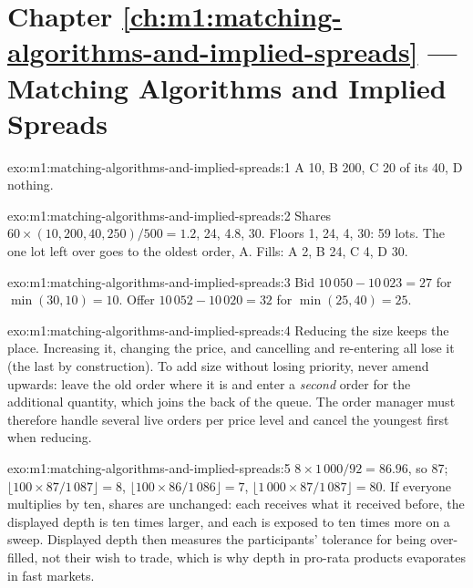 \section*{Chapter \ref{ch:m1:matching-algorithms-and-implied-spreads} --- Matching Algorithms and Implied Spreads}

\begin{solution}{exo:m1:matching-algorithms-and-implied-spreads:1}
A 10, B 200, C 20 of its 40, D nothing.
\end{solution}

\begin{solution}{exo:m1:matching-algorithms-and-implied-spreads:2}
Shares $60 \times (10, 200, 40, 250)/500 = 1.2$, 24, 4.8, 30. Floors 1, 24, 4,
30: 59 lots. The one lot left over goes to the oldest order, A. Fills: A 2, B
24, C 4, D 30.
\end{solution}

\begin{solution}{exo:m1:matching-algorithms-and-implied-spreads:3}
Bid $10\,050 - 10\,023 = 27$ for $\min(30, 10) = 10$. Offer $10\,052 - 10\,020 =
32$ for $\min(25, 40) = 25$.
\end{solution}

\begin{solution}{exo:m1:matching-algorithms-and-implied-spreads:4}
Reducing the size keeps the place. Increasing it, changing the price, and
cancelling and re-entering all lose it (the last by construction). To add
size without losing priority, never amend upwards: leave the old order where
it is and enter a \emph{second} order for the additional quantity, which
joins the back of the queue. The order manager must therefore handle several
live orders per price level and cancel the youngest first when reducing.
\end{solution}

\begin{solution}{exo:m1:matching-algorithms-and-implied-spreads:5}
$8 \times 1\,000/92 = 86.96$, so 87; $\lfloor 100 \times 87/1\,087\rfloor = 8$,
$\lfloor 100 \times 86/1\,086\rfloor = 7$, $\lfloor 1\,000 \times 87/1\,087\rfloor
= 80$. If everyone multiplies by ten, shares are unchanged: each receives
what it received before, the displayed depth is ten times larger, and each is
exposed to ten times more on a sweep. Displayed depth then measures the
participants' tolerance for being over-filled, not their wish to trade, which
is why depth in pro-rata products evaporates in fast markets.
\end{solution}

